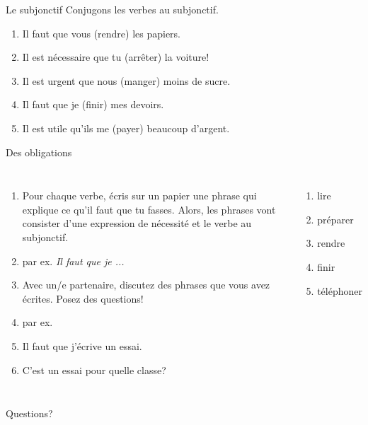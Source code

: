 \documentclass{beamer}
\begin{document}
  \begin{frame}{Le subjonctif}
    Conjugons les verbes au subjonctif.
    \begin{enumerate}
      \item Il faut \alert{que} vous \underline{} (rendre) les papiers.
      \item Il est nécessaire \alert{que} tu \underline{} (arrêter) la voiture!
      \item Il est urgent \alert{que} nous \underline{} (manger) moins de sucre.
      \item Il faut \alert{que} je \underline{} (finir) mes devoirs.
      \item Il est utile \alert{qu'}ils me \underline{} (payer) beaucoup d'argent.
    \end{enumerate}
  \end{frame}

  \begin{frame}{Des obligations}
    \small
    \begin{columns}
        \begin{enumerate}
          \item Pour chaque verbe, écris sur un papier une phrase qui explique ce qu'\alert{il faut que tu fasses}. Alors, les phrases vont consister d'une expression de nécessité et le verbe au subjonctif.
          \item[] par ex. \emph{Il faut que je ...}
          \item<2-> Avec un/e partenaire, discutez des phrases que vous avez écrites. Posez des questions!
          \item<2->[] par ex.
          \item<2->[E1:] Il faut que j'écrive un essai.
          \item<2->[E2:] C'est un essai pour quelle classe?
        \end{enumerate}
        \begin{enumerate}
          \item lire
          \item préparer
          \item rendre
          \item finir
          \item téléphoner
        \end{enumerate}
    \end{columns}
  \end{frame}

  \begin{frame}{}
    \begin{center}
      \Large Questions?
    \end{center}
  \end{frame}
\end{document}
